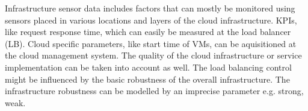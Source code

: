 Infrastructure sensor data includes factors that can mostly be monitored using sensors placed in various locations and layers of the cloud infrastructure. KPIs, like request response time, which can easily be measured at the load balancer (LB). Cloud specific parameters, like start time of VMs, can be aquisitioned at the cloud management system. %
The quality of the cloud infrastructure or service implementation can be taken into account as well. The load balancing control might be influenced by the basic robustness of the overall infrastructure. The infrastructure robustness can be modelled by an imprecise parameter e.g. strong, weak. 

